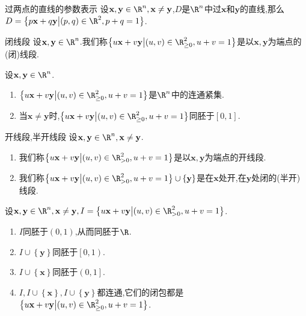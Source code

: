 \begin{proposition}{过两点的直线的参数表示}{}
	设$\mathbf{x},\mathbf{y}\in\R^{n},\mathbf{x}\neq\mathbf{y}$,$D$是$\R^{n}$中过$\mathbf{x}$和$\mathbf{y}$的直线,那么$D=\left\{p\mathbf{x}+q\mathbf{y}\middle|\left(p,q\right)\in\R^{2},p+q=1\right\}$.
\end{proposition}

\begin{definition}{闭线段}{}
	设$\mathbf{x},\mathbf{y}\in\R^{n}$.我们称$\left\{u\mathbf{x}+v\mathbf{y}\middle|\left(u,v\right)\in\R_{\geq 0}^{2},u+v=1\right\}$是以$\mathbf{x},\mathbf{y}$为端点的(闭)线段.
\end{definition}

\begin{proposition}{}{}
	设$\mathbf{x},\mathbf{y}\in\R^{n}$.
	\begin{enumerate}
		\item $\left\{u\mathbf{x}+v\mathbf{y}\middle|\left(u,v\right)\in\R_{\geq 0}^{2},u+v=1\right\}$是$\R^{n}$中的连通紧集.
		\item 当$\mathbf{x}\neq\mathbf{y}$时,$\left\{u\mathbf{x}+v\mathbf{y}\middle|\left(u,v\right)\in\R_{\geq 0}^{2},u+v=1\right\}$同胚于$\left[0,1\right]$.
	\end{enumerate}
\end{proposition}

\begin{definition}{开线段,半开线段}{}
	设$\mathbf{x},\mathbf{y}\in\R^{n},\mathbf{x}\neq\mathbf{y}$.
	\begin{enumerate}
		\item 我们称$\left\{u\mathbf{x}+v\mathbf{y}\middle|\left(u,v\right)\in\R_{>0}^{2},u+v=1\right\}$是以$\mathbf{x},\mathbf{y}$为端点的开线段.
		\item 我们称$\left\{u\mathbf{x}+v\mathbf{y}\middle|\left(u,v\right)\in\R_{>0}^{2},u+v=1\right\}\cup\left\{\mathbf{y}\right\}$是在$\mathbf{x}$处开,在$\mathbf{y}$处闭的(半开)线段.
	\end{enumerate}
\end{definition}

\begin{proposition}{}{}
	设$\mathbf{x},\mathbf{y}\in\R^{n},\mathbf{x}\neq\mathbf{y},I=\left\{u\mathbf{x}+v\mathbf{y}\middle|\left(u,v\right)\in\R_{>0}^{2},u+v=1\right\}$.
	\begin{enumerate}
		\item $I$同胚于$\left(0,1\right)$,从而同胚于$\R$.
		\item $I\cup\left\{\mathbf{y}\right\}$同胚于$\left[0,1\right)$.
		\item $I\cup\left\{\mathbf{x}\right\}$同胚于$\left(0,1\right]$.
		\item $I,I\cup\left\{\mathbf{x}\right\},I\cup\left\{\mathbf{y}\right\}$都连通,它们的闭包都是$\left\{u\mathbf{x}+v\mathbf{y}\middle|\left(u,v\right)\in\R_{\geq 0}^{2},u+v=1\right\}$.
	\end{enumerate}
\end{proposition}

